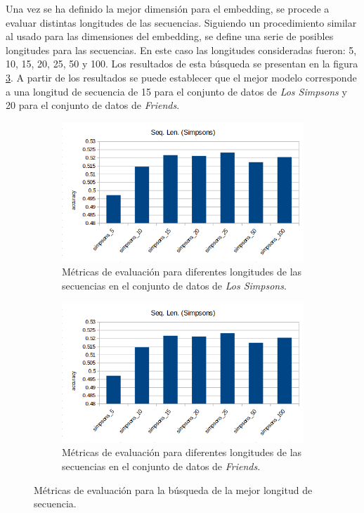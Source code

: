 Una vez se ha definido la mejor dimensión para el embedding, se procede a evaluar distintas longitudes de las secuencias. Siguiendo un procedimiento similar al usado para las dimensiones del embedding, se define una serie de posibles longitudes para las secuencias. En este caso las longitudes consideradas fueron: 5, 10, 15, 20, 25, 50 y 100. Los resultados de esta búsqueda se presentan en la figura \ref{fig:em_seq_len}. A partir de los resultados se puede establecer que el mejor modelo corresponde a una longitud de secuencia de 15 para el conjunto de datos de \textit{Los Simpsons} y 20 para el conjunto de datos de \textit{Friends}.

\begin{figure}[H]
    \centering
    \begin{subfigure}[b]{0.45\textwidth}
        \centering
        \includegraphics[width=\textwidth]{doc/images/em_models/seq_len_simpsons.png}
        \caption{Métricas de evaluación para diferentes longitudes de las secuencias en el conjunto de datos de \textit{Los Simpsons}.}
        \label{fig:em_seq_len_simpsons}
    \end{subfigure}
    \hfill
    \begin{subfigure}[b]{0.45\textwidth}
        \centering
        \includegraphics[width=\textwidth]{doc/images/em_models/seq_len_simpsons.png}
        \caption{Métricas de evaluación para diferentes longitudes de las secuencias en el conjunto de datos de \textit{Friends}.}
        \label{fig:em_seq_len_friends}
    \end{subfigure}
    \caption{Métricas de evaluación para la búsqueda de la mejor longitud de secuencia.}
    \label{fig:em_seq_len}
\end{figure}

